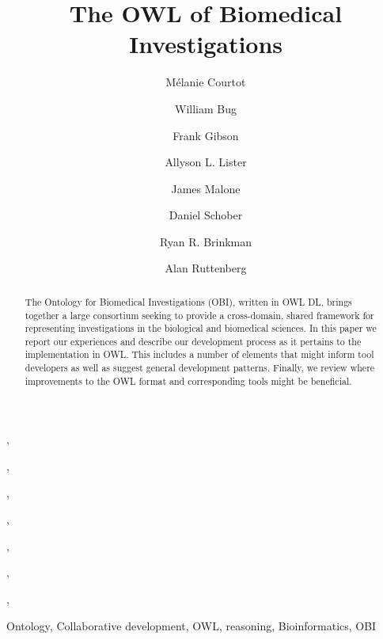 \documentclass{elsart}       %
\begin{document}
\begin{frontmatter}

\title{The OWL of Biomedical Investigations}


\author[tfl]{M\'elanie Courtot},
\author[ucsd]{William Bug},
\author[new]{Frank Gibson},
\author[cisban]{Allyson L. Lister},
\author[ebi]{James Malone},
\author[ebi,IMBI]{Daniel Schober},
\author[tfl]{Ryan R. Brinkman},
\author[sc]{Alan Ruttenberg}



\medskip


\address[tfl]{Terry Fox Laboratory, British Columbia Cancer Agency, Vancouver, BC, Canada}
\address[ucsd]{National Center for Microscopy Imaging Research, UCSD, CA, USA}
\address[new]{School of Computing Science, Newcastle University, Newcastle upon Tyne, UK}
\address[cisban]{CISBAN and School of Computing Science, Newcastle University, Newcastle upon Tyne, UK}
\address[ebi]{The European Bioinformatics Institute, Cambridge, CB101SD, UK}
\address[IMBI]{Institute of Medical Biometry and Medical Informatics (IMBI), University Medical Center, 70104 Freiburg, Germany}
\address[sc]{Science Commons, Cambridge, MA, USA}

\begin{abstract} 

The Ontology for Biomedical Investigations (OBI), written in OWL DL, brings together a large consortium seeking to provide a cross-domain, shared framework for representing investigations in the biological and biomedical sciences. In this paper we report our experiences and describe our development process as it pertains to the implementation in OWL.
This includes a number of elements that might inform tool developers as well as suggest general development patterns.
Finally, we review where improvements to the OWL format and corresponding tools might be beneficial.

\end{abstract}


\begin{keyword}
Ontology, Collaborative development, OWL, reasoning, Bioinformatics, OBI
\end{keyword}
\end{frontmatter}
\end{document}

